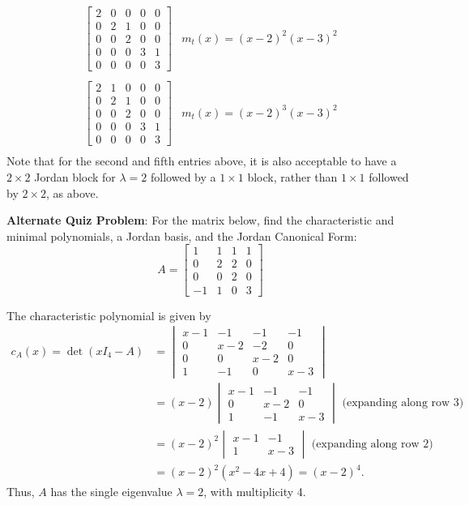 \documentclass[letterpaper,12pt]{article}
\begin{document}
\begin{enumerate}
\[\begin{array}{cc}
\begin{bmatrix}
 2&0&0&0&0\\
 0&2&1&0&0\\
 0&0&2&0&0\\
 0&0&0&3&1\\
 0&0&0&0&3
\end{bmatrix}& m_t(x) = (x-2)^2(x-3)^2\\
\\
\begin{bmatrix}
 2&1&0&0&0\\
 0&2&1&0&0\\
 0&0&2&0&0\\
 0&0&0&3&1\\
 0&0&0&0&3
\end{bmatrix}& m_t(x) = (x-2)^3(x-3)^2\\
 \end{array}
\]
Note that for the second and fifth entries above, it is also acceptable to have a $2\times 2$ Jordan block for $\lambda = 2$ followed by a $1\times 1$ block, rather than $1\times 1$ followed by $2\times 2$, as above.
\end{enumerate}
\newpage
{\bf Alternate Quiz Problem}: For the matrix below, find the characteristic and minimal polynomials, a Jordan basis, and the Jordan Canonical Form:
\[
 A = \begin{bmatrix}1&1&1&1\\0&2&2&0\\0&0&2&0\\-1&1&0&3\end{bmatrix}
\]

The characteristic polynomial is given by
\begin{align*}
 c_A(x) = \det(xI_4-A) &= \begin{vmatrix}x-1&-1&-1&-1\\0&x-2&-2&0\\0&0&x-2&0\\1&-1&0&x-3\end{vmatrix}\\
&=(x-2)\begin{vmatrix}x-1&-1&-1\\0&x-2&0\\1&-1&x-3\end{vmatrix} \text{ (expanding along row 3)}\\
&=(x-2)^2\begin{vmatrix}x-1&-1\\1&x-3\end{vmatrix} \text{ (expanding along row 2)}\\
&=(x-2)^2(x^2-4x+4)=(x-2)^4.
\end{align*}
Thus, $A$ has the single eigenvalue $\lambda=2$, with multiplicity 4.
\end{document}
